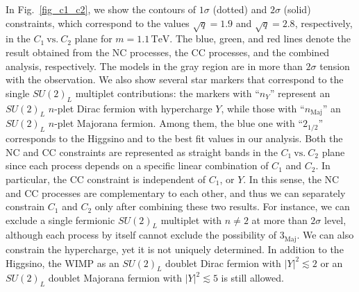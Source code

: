 \documentclass[12pt,twoside,book]{article}
\begin{document}
In Fig.~\ref{fig_c1_c2}, we show the contours of $1\sigma$ (dotted) and $2\sigma$ (solid) constraints, which correspond to the values $\sqrt{q}=1.9$ and $\sqrt{q}=2.8$, respectively, in the $C_1~\mathrm{vs.}~C_2$ plane for $m=1.1\,\mathrm{TeV}$.
The blue, green, and red lines denote the result obtained from the NC processes, the CC processes, and the combined analysis, respectively.
The models in the gray region are in more than $2\sigma$ tension with the observation.
We also show several star markers that correspond to the single $SU(2)_L$ multiplet contributions: the markers with ``$n_Y$'' represent an $SU(2)_L$ $n$-plet Dirac fermion with hypercharge $Y$, while those with ``$n_\mathrm{Maj}$'' an $SU(2)_L$ $n$-plet Majorana fermion.
Among them, the blue one with ``$2_{1/2}$'' corresponds to the Higgsino and to the best fit values in our analysis.
Both the NC and CC constraints are represented as straight bands in the $C_1~\mathrm{vs.}~C_2$ plane since each process depends on a specific linear combination of $C_1$ and $C_2$.
In particular, the CC constraint is independent of $C_1$, or $Y$.
In this sense, the NC and CC processes are complementary to each other, and thus we can separately constrain $C_1$ and $C_2$ only after combining these two results.
For instance, we can exclude a single fermionic $SU(2)_L$ multiplet with $n \neq 2$ at more than $2\sigma$ level, although each process by itself cannot exclude the possibility of $3_{\text{Maj}}$.
We can also constrain the hypercharge, yet it is not uniquely determined.
In addition to the Higgsino, the WIMP as an $SU(2)_L$ doublet Dirac fermion with $|Y|^2\lesssim 2$ or an $SU(2)_L$ doublet Majorana fermion with $|Y|^2\lesssim 5$ is still allowed.
\end{document}
